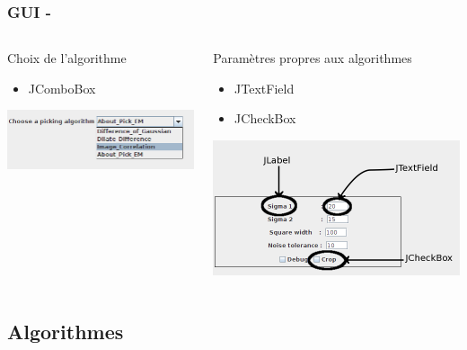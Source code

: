 \documentclass[11pt]{beamer}
\begin{document}
\begin{frame}
\frametitle{GUI - \subsubsecname}
	\begin{columns}[t]
		\begin{column}{5cm}
			\begin{block}{Choix de l'algorithme}
				\begin{itemize}
					\item JComboBox
				\end{itemize}
			\end{block}
			\vspace*{2cm}
			\includegraphics[scale=0.45]{combobx.png}
		\end{column}
		\begin{column}{5cm}
			\begin{block}{Paramètres propres aux algorithmes}
				\begin{itemize}
					\item JTextField
					\item JCheckBox
				\end{itemize}
			\end{block}
			\includegraphics[scale=0.25]{guiObject.png}
		\end{column}
	\end{columns}
\end{frame}

\subsection{Algorithmes}
\end{document}
